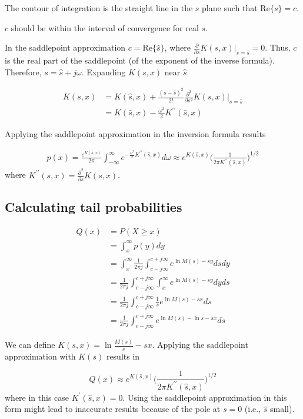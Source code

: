 The contour of integration is the straight line in the $s$ plane such that $\mathrm{Re}\{s\} = c$. 

$c$ should be within the interval of convergence for real $s$.

In the saddlepoint approximation $c = \mathrm{Re}\{\hat{s}\}$, where $\frac{\partial}{\partial s} K(s, x)|_{s=\hat{s}} = 0$. Thus, $c$ is the real part of the saddlepoint (of the exponent of the inverse formula). Therefore, $s = \hat{s} + j\omega$. Expanding $K(s,x)$ near $\hat{s}$

\begin{align} \nonumber
K(s, x) &= K(\hat{s}, x) + \frac{(s-\hat{s})^2}{2!}\frac{\partial^2}{\partial s^2}K(s,x)\bigg|_{s=\hat{s}} \\
&= K(\hat{s}, x)  -\frac{\omega^2}{2}K^{\prime\prime}(\hat{s},x)
\end{align}

Applying the saddlepoint approximation in the inversion formula results

\begin{align} \nonumber
p(x) = \frac{e^{K(\hat{s}, x)}}{2\pi }\int_{-\infty}^{\infty}e^{  -\frac{\omega^2}{2}K^{\prime\prime}(\hat{s},x)}d\omega
\approx e^{K(\hat{s},x)}\bigg(\frac{1}{2\pi K^{\prime\prime}(\hat{s},x)}\bigg)^{1/2}
\end{align}
where $K^{\prime\prime}(s,x) = \frac{\partial^2}{\partial s} K(s,x)$.

\subsection{Calculating tail probabilities}
\begin{align}
Q(x) &= P(X \geq x) \\
&= \int_x^{\infty} p(y)dy \\ \nonumber
&= \int_x^{\infty}\frac{1}{2\pi j}\int_{c-j\infty}^{c+j\infty}e^{\ln M(s) - sy}dsdy \\ \nonumber
&= \frac{1}{2\pi j}\int_{c-j\infty}^{c+j\infty}\int_x^{\infty}e^{\ln M(s) - sy}dyds \\ \nonumber
&= \frac{1}{2\pi j}\int_{c-j\infty}^{c+j\infty}\frac{1}{s}e^{\ln M(s) - sx}ds \\ 
&= \frac{1}{2\pi j}\int_{c-j\infty}^{c+j\infty}e^{\ln M(s) -\ln s- sx}ds 
\end{align}

We can define $K(s,x) = \ln\frac{M(s)}{s} - sx$. Applying the saddlepoint approximation with $K(s)$ results in

\begin{equation}
Q(x) \approx e^{K(\hat{s},x)}\bigg(\frac{1}{2\pi K^{\prime\prime}(\hat{s},x)}\bigg)^{1/2}
\end{equation}
where in this case $K^{\prime}(\hat{s},x) = 0$.
Using the saddlepoint approximation in this form might lead to inaccurate results because of the pole at $s = 0$ (i.e., $\hat{s}$ small). 
